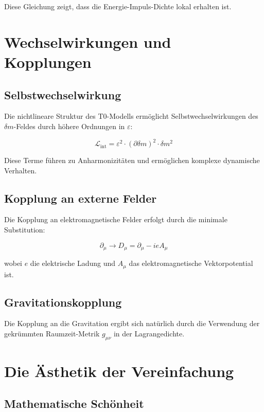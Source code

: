\documentclass[12pt,a4paper]{report}
\begin{document}
	Diese Gleichung zeigt, dass die Energie-Impuls-Dichte lokal erhalten ist.
	
	\section{Wechselwirkungen und Kopplungen}
	
	\subsection{Selbstwechselwirkung}
	
	Die nichtlineare Struktur des T0-Modells ermöglicht Selbstwechselwirkungen des $\delta m$-Feldes durch höhere Ordnungen in $\varepsilon$:
	
	\begin{equation}
		\mathcal{L}_{\text{int}} = \varepsilon^2 \cdot (\partial\delta m)^2 \cdot \delta m^2
	\end{equation}
	
	Diese Terme führen zu Anharmonizitäten und ermöglichen komplexe dynamische Verhalten.
	
	\subsection{Kopplung an externe Felder}
	
	Die Kopplung an elektromagnetische Felder erfolgt durch die minimale Substitution:
	
	\begin{equation}
		\partial_\mu \to D_\mu = \partial_\mu - ieA_\mu
	\end{equation}
	
	wobei $e$ die elektrische Ladung und $A_\mu$ das elektromagnetische Vektorpotential ist.
	
	\subsection{Gravitationskopplung}
	
	Die Kopplung an die Gravitation ergibt sich natürlich durch die Verwendung der gekrümmten Raumzeit-Metrik $g_{\mu\nu}$ in der Lagrangedichte.
	
	\section{Die Ästhetik der Vereinfachung}
	
	\subsection{Mathematische Schönheit}
	
\end{document}
